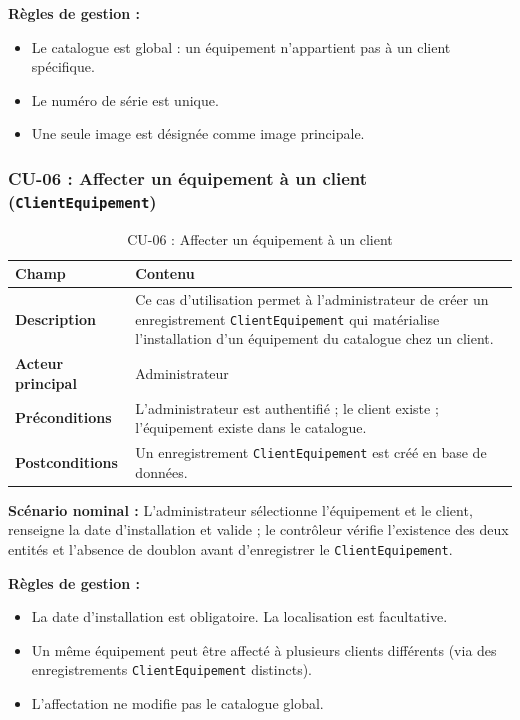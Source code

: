 \textbf{Règles de gestion :}
\begin{itemize}
    \item Le catalogue est global : un équipement n'appartient pas à un client spécifique.
    \item Le numéro de série est unique.
    \item Une seule image est désignée comme image principale.
\end{itemize}

\subsubsection{CU-06 : Affecter un équipement à un client (\texttt{ClientEquipement})}

\begin{table}[H]
\centering
\caption{CU-06 : Affecter un équipement à un client}
\label{tab:ch3:cu06}
\begin{tabular}{|p{3.5cm}|p{11cm}|}
\hline
\textbf{Champ} & \textbf{Contenu} \\
\hline
\textbf{Description}
  & Ce cas d'utilisation permet à l'administrateur de créer un enregistrement
    \texttt{ClientEquipement} qui matérialise l'installation d'un équipement du catalogue
    chez un client. \\
\hline
\textbf{Acteur principal}
  & Administrateur \\
\hline
\textbf{Préconditions}
  & L'administrateur est authentifié ; le client existe ; l'équipement existe dans le catalogue. \\
\hline
\textbf{Postconditions}
  & Un enregistrement \texttt{ClientEquipement} est créé en base de données. \\
\hline
\end{tabular}
\end{table}

\textbf{Scénario nominal :} L'administrateur sélectionne l'équipement et le client, renseigne la date d'installation et valide ; le contrôleur vérifie l'existence des deux entités et l'absence de doublon avant d'enregistrer le \texttt{ClientEquipement}.

\textbf{Règles de gestion :}
\begin{itemize}
    \item La date d'installation est obligatoire. La localisation est facultative.
    \item Un même équipement peut être affecté à plusieurs clients différents
          (via des enregistrements \texttt{ClientEquipement} distincts).
    \item L'affectation ne modifie pas le catalogue global.
\end{itemize}

